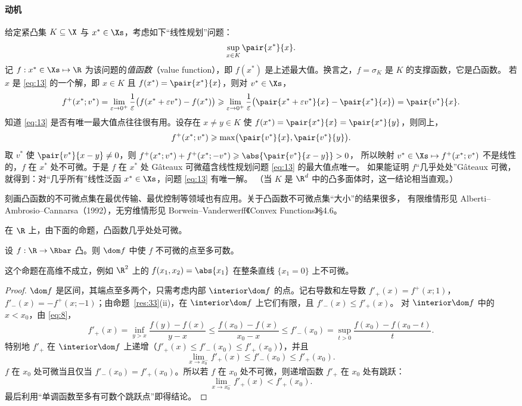 \paragraph{动机} 给定紧凸集 $K\subseteq\X$ 与 $x^*\in\Xs$，考虑如下“线性规划”问题：
\begin{equation}
  \sup_{x\in K}\pair{x^*}{x}.
  \label{eq:13}
\end{equation}
记 $f:x^*\in\Xs\mapsto\R$ 为该问题的\emph{值函数}（value function），即 $f(x^*)$ 是上述最大值。换言之，$f=\sigma_K$ 是 $K$ 的支撑函数，它是凸函数。
若 $x$ 是 \eqref{eq:13} 的一个解，即 $x\in K$ 且 $f(x^*)=\pair{x^*}{x}$，则对 $v^*\in\Xs$，
\[
  f^+(x^*;v^*)=\lim_{\varepsilon\to0^+}\frac1\varepsilon\bigl(f(x^*+\varepsilon v^*)-f(x^*)\bigr)
  \geqslant\lim_{\varepsilon\to0^+}\frac1\varepsilon\bigl(\pair{x^*+\varepsilon v^*}{x}-\pair{x^*}{x}\bigr)=\pair{v^*}{x}.
\]
知道 \eqref{eq:13} 是否有唯一最大值点往往很有用。设存在 $x\neq y\in K$ 使 $f(x^*)=\pair{x^*}{x}=\pair{x^*}{y}$，则同上，
\[
  f^+(x^*;v^*)\geqslant\max\bigl(\pair{v^*}{x},\pair{v^*}{y}\bigr).
\]
取 $v^*$ 使 $\pair{v^*}{x-y}\neq0$，则 $f^+(x^*;v^*)+f^+(x^*;-v^*)\geqslant\abs{\pair{v^*}{x-y}}>0$，
所以映射 $v^*\in\Xs\mapsto f^+(x^*;v^*)$ 不是线性的，$f$ 在 $x^*$ 处不可微。于是 $f$ 在 $x^*$ 处 Gâteaux 可微蕴含线性规划问题 \eqref{eq:13} 的最大值点唯一。
如果能证明 $f$“几乎处处”Gâteaux 可微，就得到：对“几乎所有”线性泛函 $x^*\in\Xs$，问题 \eqref{eq:13} 有唯一解。
（当 $K$ 是 $\R^d$ 中的凸多面体时，这一结论相当直观。）

\begin{remark}
\label{rem:20}
刻画凸函数的不可微点集在最优传输、最优控制等领域也有应用。关于凸函数不可微点集“大小”的结果很多，
有限维情形见 Alberti--Ambrosio--Cannarsa（1992），无穷维情形见 Borwein--Vanderwerff《Convex Functions》§4.6。
\end{remark}

在 $\R$ 上，由下面的命题，凸函数几乎处处可微。

\begin{proposition}
\label{res:46}
设 $f:\R\to\Rbar$ 凸。则 $\dom f$ 中使 $f$ 不可微的点至多可数。
\end{proposition}

这个命题在高维不成立，例如 $\R^2$ 上的 $f(x_1,x_2)=\abs{x_1}$ 在整条直线 $\{x_1=0\}$ 上不可微。

\begin{proof}
$\dom f$ 是区间，其端点至多两个，只需考虑内部 $\interior\dom f$ 的点。记右导数和左导数
$f'_+(x)=f^+(x;1)$，$f'_-(x)=-f^+(x;-1)$；由命题~\ref{res:33}(ii)，在 $\interior\dom f$ 上它们有限，且 $f'_-(x)\leqslant f'_+(x)$。
对 $\interior\dom f$ 中的 $x<x_0$，由 \eqref{eq:8}，
\[
  f'_+(x)=\inf_{y>x}\frac{f(y)-f(x)}{y-x}\leqslant\frac{f(x_0)-f(x)}{x_0-x}\leqslant f'_-(x_0)=\sup_{t>0}\frac{f(x_0)-f(x_0-t)}{t}.
\]
特别地 $f'_+$ 在 $\interior\dom f$ 上递增（$f'_+(x)\leqslant f'_-(x_0)\leqslant f'_+(x_0)$），并且
\[
  \lim_{x\to x_0^-}f'_+(x)\leqslant f'_-(x_0)\leqslant f'_+(x_0).
\]
$f$ 在 $x_0$ 处可微当且仅当 $f'_-(x_0)=f'_+(x_0)$。所以若 $f$ 在 $x_0$ 处不可微，则递增函数 $f'_+$ 在 $x_0$ 处有跳跃：
\[
  \lim_{x\to x_0^-}f'_+(x)<f'_+(x_0).
\]
最后利用“单调函数至多有可数个跳跃点”即得结论。
\end{proof}

